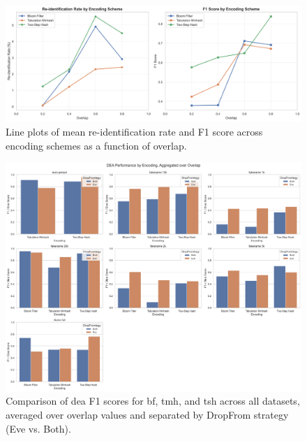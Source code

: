 \begin{figure}[H]
    \centering
    \includegraphics[width=\textwidth]{figures/dea_encoding_comparison_line_charts.png}
    \caption{Line plots of mean re-identification rate and F1 score across encoding schemes as a function of overlap.}
    \label{fig:dea_encoding_comparison_lines}
\end{figure}

\begin{figure}[H]
    \centering
    \includegraphics[width=\textwidth]{figures/dea_encoding_comparison_all_datasets.png}
    \caption{Comparison of \ac{dea} F1 scores for \ac{bf}, \ac{tmh}, and \ac{tsh} across all datasets, averaged over overlap values and separated by DropFrom strategy (Eve vs. Both).}
    \label{fig:dea_encoding_comparison_bar}
\end{figure}





